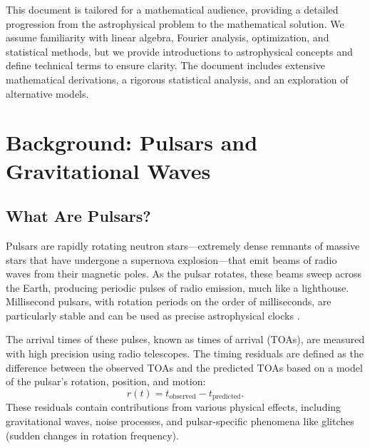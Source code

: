 \documentclass[11pt]{article}
\begin{document}
This document is tailored for a mathematical audience, providing a detailed progression from the astrophysical problem to the mathematical solution. We assume familiarity with linear algebra, Fourier analysis, optimization, and statistical methods, but we provide introductions to astrophysical concepts and define technical terms to ensure clarity. The document includes extensive mathematical derivations, a rigorous statistical analysis, and an exploration of alternative models.

\section{Background: Pulsars and Gravitational Waves}

\subsection{What Are Pulsars?}
Pulsars are rapidly rotating neutron stars—extremely dense remnants of massive stars that have undergone a supernova explosion—that emit beams of radio waves from their magnetic poles. As the pulsar rotates, these beams sweep across the Earth, producing periodic pulses of radio emission, much like a lighthouse. Millisecond pulsars, with rotation periods on the order of milliseconds, are particularly stable and can be used as precise astrophysical clocks \citep{lorimer2008}.

The arrival times of these pulses, known as times of arrival (TOAs), are measured with high precision using radio telescopes. The timing residuals are defined as the difference between the observed TOAs and the predicted TOAs based on a model of the pulsar’s rotation, position, and motion:
\[
r(t) = t_{\text{observed}} - t_{\text{predicted}}.
\]
These residuals contain contributions from various physical effects, including gravitational waves, noise processes, and pulsar-specific phenomena like glitches (sudden changes in rotation frequency).
\end{document}
